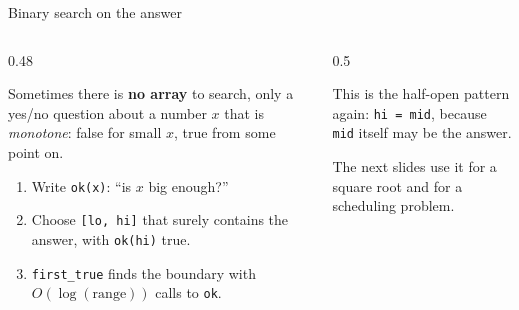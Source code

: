 \documentclass[aspectratio=169,10pt]{beamer}
\newcommand{\cellsx}[5]{\foreach \v/\c [count=\i from 0] in {#5}{\node[#1,fill=\c] at (#3+\i*#2,#4) {\v};}}
\begin{document}
\begin{frame}{Binary search on the answer}
\begin{columns}[T]
\begin{column}{0.48\textwidth}
\begin{sfig}[0.3]
\end{sfig}
\vspace{2mm}
{\small
Sometimes there is \textbf{no array} to search, only a yes/no question about a number $x$ that is \emph{monotone}: false for small $x$, true from some point on.

\vspace{2mm}
\begin{enumerate}\setlength\itemsep{2pt}
\item Write \texttt{ok(x)}: ``is $x$ big enough?''
\item Choose \texttt{[lo, hi]} that surely contains the answer, with \texttt{ok(hi)} true.
\item \texttt{first\_true} finds the boundary with $O(\log(\text{range}))$ calls to \texttt{ok}.
\end{enumerate}}
\end{column}
\begin{column}{0.5\textwidth}
\vspace{2mm}
{\small
This is the half-open pattern again: \texttt{hi = mid}, because \texttt{mid} itself may be the answer.

\vspace{2mm}
The next slides use it for a square root and for a scheduling problem.}
\end{column}
\end{columns}
\end{frame}
\end{document}
